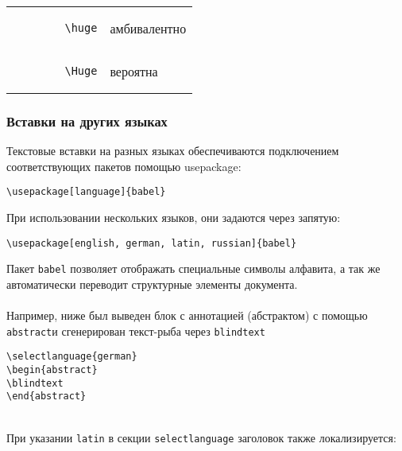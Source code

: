 \documentclass[a4paper]{article}
\newcommand{\cbox}[2][green]{%
  \colorbox{#1}{\parbox{\dimexpr\linewidth-2\fboxsep}{#2}}%
}
\begin{document}
\begin{tabular}{l l}
		\begin{lstlisting}
		\huge
		\end{lstlisting} &  амбивалентно                                                                                            \\
		
		\begin{lstlisting}
		\Huge
		\end{lstlisting} &  вероятна                                                                                                        \\
\end{tabular}

\subsubsection{Вставки на других языках}
Текстовые вставки на разных языках обеспечиваются подключением соответствующих пакетов помощью usepackage:
\begin{lstlisting}
\usepackage[language]{babel}
\end{lstlisting}
\thispagestyle{empty}
\newpage
При использовании нескольких языков, они задаются через запятую:
\begin{lstlisting}
\usepackage[english, german, latin, russian]{babel}
\end{lstlisting}\hfill\break
Пакет \lstinline{babel} позволяет отображать специальные символы алфавита, а так же автоматически переводит структурные элементы документа. \\\\
Например, ниже был выведен блок с аннотацией (абстрактом) с помощью \lstinline{abstract}и сгенерирован текст-рыба через \lstinline{blindtext} 
\begin{lstlisting}
\selectlanguage{german}
\begin{abstract}
\blindtext
\end{abstract}
\end{lstlisting}
\cbox[lightgray!20]{
	\begin{abstract}
		\blindtext
	\end{abstract}
}
 \\
При указании \lstinline{latin} в секции \lstinline{selectlanguage} заголовок также локализируется:\\
\cbox[lightgray!20]{
	\begin{abstract}
		\blindtext
	\end{abstract}
}
\end{document}
